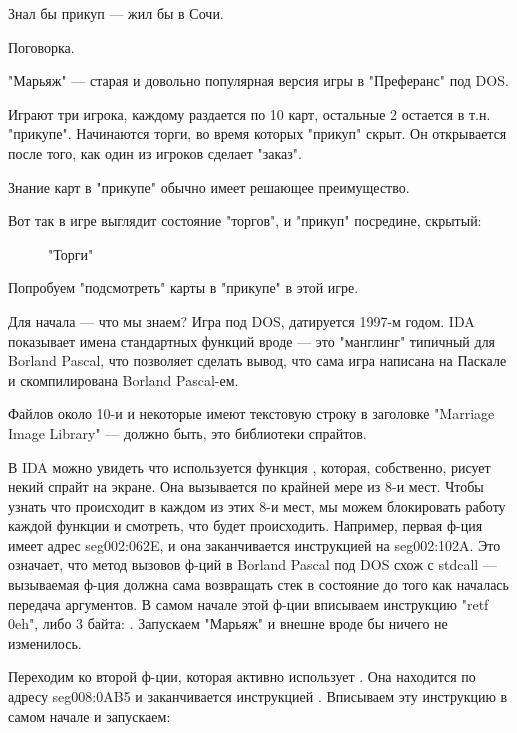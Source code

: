 
\epigraph{Знал бы прикуп --- жил бы в Сочи.}{Поговорка.}

"Марьяж" --- старая и довольно популярная версия игры в "Преферанс" под DOS.

Играют три игрока, каждому раздается по 10 карт, остальные 2 остается в т.н. "прикупе".
Начинаются торги, во время которых "прикуп" скрыт.
Он открывается после того, как один из игроков сделает "заказ".

Знание карт в "прикупе" обычно имеет решающее преимущество.

Вот так в игре выглядит состояние "торгов", и "прикуп" посредине, скрытый:

\begin{figure}[H]
\centering
{}
\caption{"Торги"}
\end{figure}

Попробуем "подсмотреть" карты в "прикупе" в этой игре.

Для начала --- что мы знаем?
Игра под DOS, датируется 1997-м годом. IDA показывает имена стандартных функций вроде 
 --- это "манглинг" типичный для Borland Pascal, что позволяет сделать вывод,
что сама игра написана на Паскале и скомпилирована Borland Pascal-ем.

Файлов около 10-и и некоторые имеют текстовую строку в заголовке "Marriage Image Library" --- должно быть,
это библиотеки спрайтов.

В IDA можно увидеть что используется функция , которая, собственно,
рисует некий спрайт на экране.
Она вызывается по крайней мере из 8-и мест.
Чтобы узнать что происходит в каждом из этих 8-и мест, мы можем блокировать работу каждой функции и смотреть,
что будет происходить.
Например, первая ф-ция имеет адрес seg002:062E, и она заканчивается инструкцией  на seg002:102A.
Это означает, что метод вызовов ф-ций в Borland Pascal под DOS схож с stdcall --- вызываемая ф-ция должна сама
возвращать стек в состояние до того как началась передача аргументов.
В самом начале этой ф-ции вписываем инструкцию "retf 0eh", либо 3 байта: .
Запускаем "Марьяж" и внешне вроде бы ничего не изменилось.

Переходим ко второй ф-ции, которая активно использует .
Она находится по адресу seg008:0AB5 и заканчивается инструкцией .
Вписываем эту инструкцию в самом начале и запускаем:

